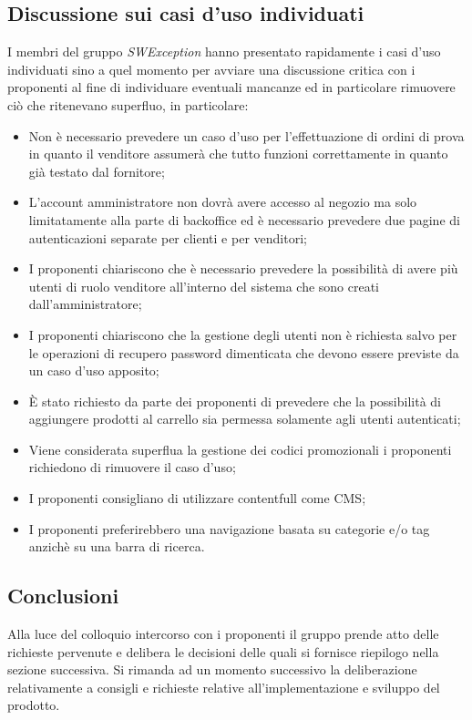 \subsection{Discussione sui casi d'uso individuati}
I membri del gruppo \textit{SWException} hanno presentato rapidamente i casi d'uso individuati sino a quel momento per avviare una discussione critica con i proponenti al fine di individuare eventuali mancanze ed in particolare rimuovere ciò che ritenevano superfluo,  in particolare:
\begin{itemize}

\item Non è necessario prevedere un caso d'uso per l'effettuazione di ordini di prova in quanto il venditore assumerà che tutto funzioni correttamente in quanto già testato dal fornitore;
\item L'account amministratore non dovrà avere accesso al negozio ma solo limitatamente alla parte di backoffice ed è necessario prevedere due pagine di autenticazioni separate per clienti e per venditori;
\item I proponenti chiariscono che è necessario prevedere la possibilità di avere più utenti di ruolo venditore all'interno del sistema che sono creati dall'amministratore; 
\item I proponenti chiariscono che la gestione degli utenti non è richiesta salvo per le operazioni di recupero password dimenticata che devono essere previste da un caso d'uso apposito;
\item È stato richiesto da parte dei proponenti di prevedere che la possibilità di aggiungere prodotti al carrello sia permessa solamente agli utenti autenticati;
\item Viene considerata superflua la gestione dei codici promozionali i proponenti richiedono di rimuovere il caso d'uso;
\item I proponenti consigliano di utilizzare contentfull come CMS;
\item I proponenti preferirebbero una navigazione basata su categorie e/o tag anzichè su una barra di ricerca.

\end{itemize}

\subsection{Conclusioni}
Alla luce del colloquio intercorso con i proponenti il gruppo prende atto delle richieste pervenute e delibera le decisioni delle quali si fornisce riepilogo nella sezione successiva.  Si rimanda ad un momento successivo la deliberazione relativamente a consigli e richieste relative all'implementazione e sviluppo del prodotto.